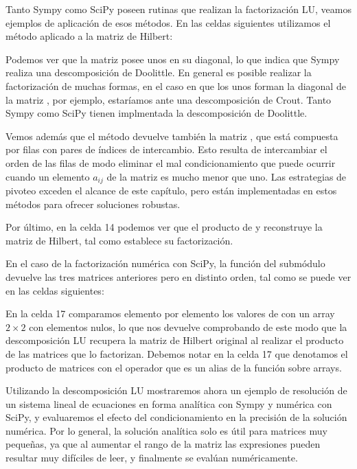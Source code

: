 Tanto Sympy como SciPy poseen rutinas que realizan la factorización LU, veamos ejemplos de aplicación de esos métodos. En las celdas siguientes utilizamos el método  aplicado a la matriz de Hilbert:

Podemos ver que la matriz  posee unos en su diagonal, lo que indica que Sympy realiza una descomposición de Doolittle. En general es posible realizar la factorización de muchas formas, en el caso en que los unos forman la diagonal de la matriz , por ejemplo, estaríamos ante una descomposición de Crout. Tanto Sympy como SciPy tienen implmentada la descomposición de Doolittle.

Vemos además que el método devuelve también la matriz , que está compuesta por filas con pares de índices de intercambio. Esto resulta de intercambiar el orden de las filas de modo eliminar el mal condicionamiento que puede ocurrir cuando un elemento $a_{ij}$ de la matriz es mucho menor que uno. Las estrategias de pivoteo exceden el alcance de este capítulo, pero están implementadas en estos métodos para ofrecer soluciones robustas.

Por último, en la celda 14 podemos ver que el producto de  y  reconstruye la matriz de Hilbert, tal como establece su factorización.

En el caso de la factorización numérica con SciPy, la función  del submódulo  devuelve las tres matrices anteriores pero en distinto orden, tal como se puede ver en las celdas siguientes:

En la celda 17 comparamos elemento por elemento los valores de  con un array $2 \times 2$ con elementos nulos, lo que nos devuelve  comprobando de este modo que la descomposición LU recupera la matriz de Hilbert original al realizar el producto de las matrices que lo factorizan. Debemos notar en la celda 17 que denotamos el producto de matrices con el operador  que es un alias de la función  sobre arrays.

Utilizando la descomposición LU mostraremos ahora un ejemplo de resolución de un sistema lineal de ecuaciones en forma analítica con Sympy y numérica con SciPy, y evaluaremos el efecto del condicionamiento en la precisión de la solución numérica. Por lo general, la solución analítica solo es útil para matrices muy pequeñas, ya que al aumentar el rango de la matriz las expresiones pueden resultar muy difíciles de leer, y finalmente se evalúan numéricamente. 

